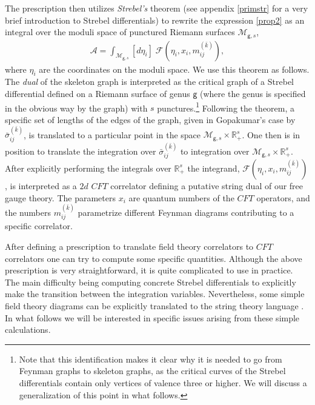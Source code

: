 \documentclass[11pt]{JHEP3}
\def\be{\begin{eqnarray}}
\def\ee{\end{eqnarray}}
\def\s{\sigma}
\def\s{\sigma}
\def\gg{\mathsf g }
\begin{document}
The prescription then 
utilizes \textit{Strebel's} theorem \cite{Strebel,mulase,zvon} (see appendix \ref{primstr} for a very brief introduction to Strebel differentials) to rewrite the expression \eqref{prop2} as an integral
over the moduli space of punctured Riemann surfaces ${\mathcal M}_{\gg,s}$,
\be
{\mathcal A}=\int_{{\mathcal M}_{\gg,s}} [d\eta_i]\;{\mathcal F}(\eta_i, x_i, m_{ij}^{(\bar k)}),
\ee where $\eta_i$ are the coordinates on the moduli space.
We use this theorem as follows. The \textit{dual} of the skeleton graph is interpreted as 
the critical graph of a Strebel differential defined on a Riemann surface of genus $\gg$ (where
the genus is specified in the obvious way by the graph) with $s$ punctures.\footnote{Note
that this identification makes it clear why it is needed to go from Feynman graphs to skeleton
graphs, as the critical curves of the Strebel differentials contain only vertices of valence 
three or higher. We will discuss a generalization of this point in what follows.} Following the theorem,
a specific set of lengths of the edges of the graph, given in Gopakumar's case by
$\bar \s_{ij}^{(\bar k)}$, is translated to a particular point in the space 
${\mathcal M}_{\gg,s}\times {\mathbb R}^s_+$. One then is in position to translate the integration
over $\bar \s_{ij}^{(\bar k)}$ to integration over ${\mathcal M}_{\gg,s}\times {\mathbb R}^s_+$.
After explicitly performing the integrals over ${\mathbb R}^s_+$ the integrand, 
${\mathcal F}(\eta_i, x_i, m_{ij}^{(\bar k)})$, is interpreted as a $2d$ $CFT$ correlator defining
a putative string dual of our free gauge theory. The parameters $x_i$ 
are quantum numbers of the $CFT$ operators, and the numbers $m_{ij}^{(\bar k)}$ parametrize different
Feynman diagrams contributing to a specific correlator.  

\medskip
After defining a prescription to translate field theory correlators to $CFT$ correlators
one can try to compute some specific quantities. Although the above prescription
is very straightforward, it is quite complicated to use in practice. The main difficulty
being computing concrete Strebel differentials to explicitly make the transition 
between the integration variables. Nevertheless, some simple field theory diagrams can be explicitly translated to the string theory language
\cite{Aharony:2006th,David:2006qc,Aharony:2007fs}. In what follows we will be interested
in specific issues arising from these simple calculations. 
\end{document}
